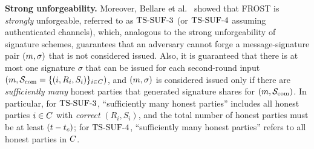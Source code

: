 \medskip
\textbf{Strong unforgeability.} Moreover, Bellare et al.~\cite{BellareCKMTZ22} showed that FROST is \emph{strongly} unforgeable, referred to as $\mathrm{TS}\mbox{-}\mathrm{SUF}\mbox{-}{3}$ (or $\mathrm{TS}\mbox{-}\mathrm{SUF}\mbox{-}{4}$ assuming authenticated channels), which, analogous to the strong unforgeability of signature schemes, guarantees that an adversary cannot forge a message-signature pair $(m,\sigma)$ that is not considered issued.
Also, it is guaranteed that there is at most one signature $\sigma$ that can be issued for each second-round input $(m, \mathcal{S}_{\rm com}=\{ (i, R_{i}, S_{i})\}_{i \in C})$, and $(m, \sigma)$ is considered issued only if there are \emph{sufficiently many} honest parties that generated signature shares for $(m, \mathcal{S}_{\rm com})$.
In particular, for $\mathrm{TS}\mbox{-}\mathrm{SUF}\mbox{-}{3}$, ``sufficiently many honest parties'' includes all honest parties $i\in C$ with \emph{correct} $(R_{i}, S_{i})$, and the total number of honest parties must be at least $(t - t_c)$; for $\mathrm{TS}\mbox{-}\mathrm{SUF}\mbox{-}{4}$, ``sufficiently many honest parties'' refers to all honest parties in $C$.





